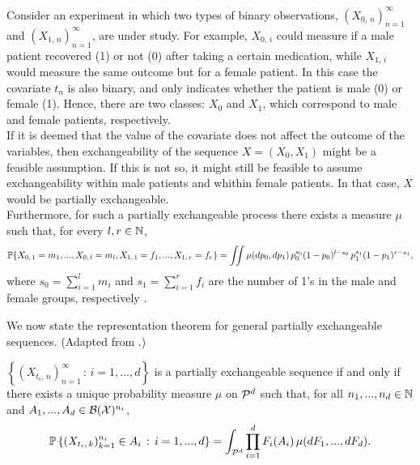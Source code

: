 \begin{mdframed}[backgroundcolor=mygray] 
	\begin{example} 
		Consider an experiment in which two types of binary observations, $(X_{0, \, n})_{n=1}^{\infty}$ and $(X_{1, \, n})_{n=1}^{\infty}$, are under study. For example, $X_{0, \, i}$ could measure if a male patient recovered (1) or not (0) after taking a certain medication, while $X_{1, \, i}$ would measure the same outcome but for a female patient. In this case the covariate $t_n$ is also binary, and only indicates whether the patient is male (0) or female (1). Hence, there are two classes: $X_0$ and $X_1$, which correspond to male and female patients, respectively. \\
		
		If it is deemed that the value of the covariate does not affect the outcome of the variables, then exchangeability of the sequence $X = (X_0, X_1)$ might be a feasible assumption. If this is not so, it might still be feasible to assume exchangeability within male patients and whithin female patients. In that case, $X$ would be partially exchangeable. \\
		
		Furthermore, for such a partially exchangeable process there exists a measure $\mu$ such that, for every $l, r \in \mathbb{N}$,
				\begin{equation*}
			\mathbb{P} \{ X_{0, \, 1} = m_1, ..., X_{0, \, l} = m_l, X_{1, \, 1} = f_1, ..., X_{1, \, r} = f_r \} = \iint  \mu(dp_0, dp_1) \, p_0^{s_0} (1-p_0)^{l-s_0} \, p_1^{s_1} (1-p_1)^{r-s_1},
		\end{equation*}
		where $s_0 = \sum_{i=1}^l m_i$ and $s_1 = \sum_{i=1}^r f_i$ are the number of 1's in the male and female groups, respectively \cite[][p.~112-113]{Diaconis:1988:PartialExchang}.
	\end{example}
\end{mdframed}

We now state the representation theorem for general partially exchangeable sequences. (Adapted from \cite[][p.~69]{CamerlenghiEtAl:2019:partial_exchang_hierarchical}.)


\begin{theorem} \label{thm:definetti_partial}
	$\left\{ (X_{t_i, \, n})_{n=1}^{\infty} \, : \, i=1, ..., d \right\}$ is a partially exchangeable sequence if and only if there exists a unique probability measure $\mu$ on $\mathcal{P}^d$ such that, for all $n_1, ..., n_d \in \mathbb{N}$ and $A_1, ..., A_d \in \mathcal{B}(\mathcal{X})^{n_i}$,
	\begin{equation} \label{eq:definetti_partial_thm}
		\mathbb{P} \left\{ (X_{t_i, \, k})_{k=1}^{n_i} \in A_i \, : \, i=1, ..., d  \right\} = \int_{\mathcal{P}^d}  \prod_{i=1}^d F_i(A_i) \, \mu(dF_1, ..., dF_d).
	\end{equation}
\end{theorem}



